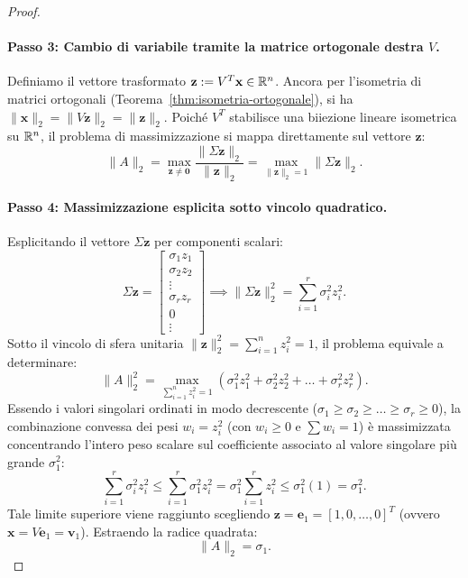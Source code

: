 \begin{proof}
\paragraph{Passo 3: Cambio di variabile tramite la matrice ortogonale destra $V$.}
Definiamo il vettore trasformato $\mathbf{z} := V^T \mathbf{x} \in \mathbb{R}^n$. Ancora per l'isometria di matrici ortogonali (Teorema~\ref{thm:isometria-ortogonale}), si ha $\|\mathbf{x}\|_2 = \|V \mathbf{z}\|_2 = \|\mathbf{z}\|_2$. Poich\'e $V^T$ stabilisce una biiezione lineare isometrica su $\mathbb{R}^n$, il problema di massimizzazione si mappa direttamente sul vettore $\mathbf{z}$:
\begin{equation}
    \|A\|_2 = \max_{\mathbf{z} \neq \mathbf{0}} \frac{\|\Sigma \mathbf{z}\|_2}{\|\mathbf{z}\|_2} = \max_{\|\mathbf{z}\|_2 = 1} \|\Sigma \mathbf{z}\|_2.
\end{equation}

\paragraph{Passo 4: Massimizzazione esplicita sotto vincolo quadratico.}
Esplicitando il vettore $\Sigma \mathbf{z}$ per componenti scalari:
\begin{equation}
    \Sigma \mathbf{z} = \begin{bmatrix} \sigma_1 z_1 \\ \sigma_2 z_2 \\ \vdots \\ \sigma_r z_r \\ 0 \\ \vdots \end{bmatrix} \implies \|\Sigma \mathbf{z}\|_2^2 = \sum_{i=1}^r \sigma_i^2 z_i^2.
\end{equation}
Sotto il vincolo di sfera unitaria $\|\mathbf{z}\|_2^2 = \sum_{i=1}^n z_i^2 = 1$, il problema equivale a determinare:
\begin{equation}
    \|A\|_2^2 = \max_{\sum_{i=1}^n z_i^2 = 1} \left( \sigma_1^2 z_1^2 + \sigma_2^2 z_2^2 + \dots + \sigma_r^2 z_r^2 \right).
\end{equation}
Essendo i valori singolari ordinati in modo decrescente ($\sigma_1 \ge \sigma_2 \ge \dots \ge \sigma_r \ge 0$), la combinazione convessa dei pesi $w_i = z_i^2$ (con $w_i \ge 0$ e $\sum w_i = 1$) \`e massimizzata concentrando l'intero peso scalare sul coefficiente associato al valore singolare pi\`u grande $\sigma_1^2$:
\begin{equation}
    \sum_{i=1}^r \sigma_i^2 z_i^2 \le \sum_{i=1}^r \sigma_1^2 z_i^2 = \sigma_1^2 \sum_{i=1}^r z_i^2 \le \sigma_1^2 (1) = \sigma_1^2.
\end{equation}
Tale limite superiore viene raggiunto scegliendo $\mathbf{z} = \mathbf{e}_1 = [1, 0, \dots, 0]^T$ (ovvero $\mathbf{x} = V \mathbf{e}_1 = \mathbf{v}_1$). Estraendo la radice quadrata:
\begin{equation}
    \|A\|_2 = \sigma_1.
\end{equation}
\end{proof}


